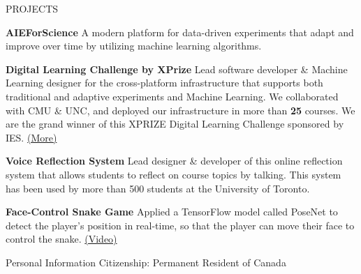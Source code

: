 \documentclass{resume} %
\begin{document}
\begin{rSection}{PROJECTS}
\vspace{-1.25em}
\item \textbf{AIEForScience} {A modern platform for data-driven experiments that adapt and improve over time by utilizing machine learning algorithms.}

\item \textbf{Digital Learning Challenge by XPrize} {Lead software developer \& Machine Learning designer for the cross-platform infrastructure that supports both traditional and adaptive experiments and Machine Learning. We collaborated with CMU \& UNC, and deployed our infrastructure in more than \textbf{25} courses. We are the grand winner of this XPRIZE Digital Learning Challenge sponsored by IES. \href{https://www.xprize.org/challenge/digitallearning/finalist-teams}{(More)}}

\item \textbf{Voice Reflection System} {Lead designer \& developer of this online reflection system that allows students to reflect on course topics by talking. This system has been used by more than 500 students at the University of Toronto.}

\item \textbf{Face-Control Snake Game} {Applied a TensorFlow model called PoseNet to detect the player's position in real-time, so that the player can move their face to control the snake. \href{https://www.youtube.com/watch?v=Zn_5Oy7DZJw}{(Video)}}
\end{rSection} 

\begin{rSection}{Personal Information}
    Citizenship: Permanent Resident of Canada
    
\end{rSection}
\end{document}
